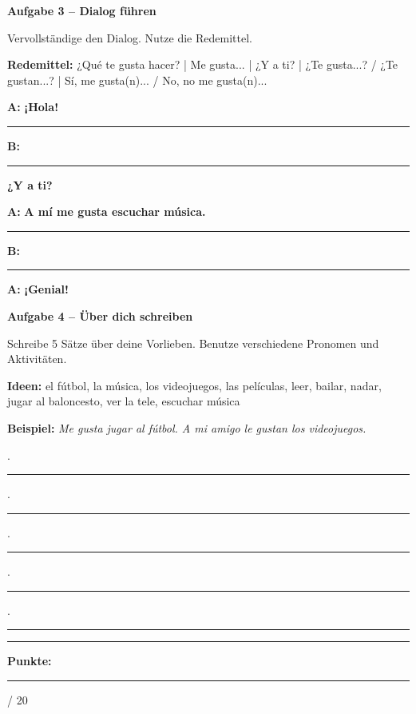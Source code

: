 \documentclass[11pt, a4paper]{article}
\newcommand{\fachfarbe}{spanisch}
\newcommand{\maxpunkte}{20}
\newcommand{\punktebox}[1]{\hfill\fbox{\small \_/#1}}
\newcommand{\luecke}[1]{\rule{#1}{0.4pt}}
\newcommand{\es}[1]{\textcolor{\fachfarbe}{\textbf{#1}}}
\newenvironment{aufgabe}[1]{%
    \needspace{5\baselineskip}%
    \nopagebreak[4]%
    \vspace{10pt}
    \noindent\textbf{\textcolor{\fachfarbe}{Aufgabe #1}}
    \nopagebreak[4]%
    \vspace{5pt}
    \nopagebreak[4]%
    \begin{list}{}{\leftmargin=0pt}
    \item[]
}{%
    \end{list}
}
\begin{document}

\begin{aufgabe}{3 -- Dialog führen}
Vervollständige den Dialog. Nutze die Redemittel. \punktebox{5}
\end{aufgabe}

\begin{hinweis}
\textbf{Redemittel:} ¿Qué te gusta hacer? | Me gusta... | ¿Y a ti? | ¿Te gusta...? / ¿Te gustan...? | Sí, me gusta(n)... / No, no me gusta(n)...
\end{hinweis}

\vspace{0.5em}

\noindent
\textbf{A:} \es{¡Hola!} \luecke{5cm}

\textbf{B:} \luecke{6cm} \es{¿Y a ti?}

\textbf{A:} \es{A mí me gusta escuchar música.} \luecke{4cm}

\textbf{B:} \luecke{6cm}

\textbf{A:} \es{¡Genial!}

\vspace{15pt}


\begin{aufgabe}{4 -- Über dich schreiben}
Schreibe 5 Sätze über deine Vorlieben. Benutze verschiedene Pronomen und Aktivitäten. \punktebox{6}
\end{aufgabe}

\begin{hinweis}
\textbf{Ideen:} el fútbol, la música, los videojuegos, las películas, leer, bailar, nadar, jugar al baloncesto, ver la tele, escuchar música
\end{hinweis}

\vspace{0.5em}

\noindent
\textbf{Beispiel:} \textit{Me gusta jugar al fútbol. A mi amigo le gustan los videojuegos.}

\vspace{0.8em}
. \rule{\textwidth}{0.4pt}

\vspace{0.8em}
. \rule{\textwidth}{0.4pt}

\vspace{0.8em}
. \rule{\textwidth}{0.4pt}

\vspace{0.8em}
. \rule{\textwidth}{0.4pt}

\vspace{0.8em}
. \rule{\textwidth}{0.4pt}

\vspace{20pt}
\hrule
\vspace{10pt}

\begin{flushright}
\textbf{Punkte:} \luecke{1cm} / \maxpunkte
\end{flushright}
\end{document}
